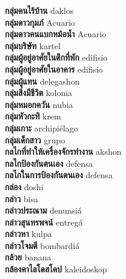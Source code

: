 \textbf{ กลุ่มคนไร้บ้าน  } daklos \\
\textbf{ กลุ่มดาวกุมภ์  } Acuario \\
\textbf{ กลุ่มดาวคนแบกหม้อน้ำ  } Acuario \\
\textbf{ กลุ่มบริษัท  } kartel \\
\textbf{ กลุ่มผู้อยู่อาศัยในตึกที่พัก  } edifisio \\
\textbf{ กลุ่มผู้อยู่อาศัยในอาคาร  } edifisio \\
\textbf{ กลุ่มผู้แทน  } delegashon \\
\textbf{ กลุ่มสิ่งมีชีวิต  } kolonia \\
\textbf{ กลุ่มหมอกควัน  } nubia \\
\textbf{ กลุ่มหัวกะทิ  } krem \\
\textbf{ กลุ่มเกาะ  } archipiélago \\
\textbf{ กลุ่มเด็กสาว  } grupo \\
\textbf{ กลไกที่ทำให้เครื่องจักรทำงาน  } akshon \\
\textbf{ กลไกป้องกันตนเอง  } defensa \\
\textbf{ กลไกในการป้องกันตนเอง  } defensa \\
\textbf{ กล่อง  } doshi \\
\textbf{ กล่าว  } bisa \\
\textbf{ กล่าวประณาม  } denunsiá \\
\textbf{ กล่าวสุนทรพจน์  } entregá \\
\textbf{ กล่าวหา  } kulpa \\
\textbf{ กล่าวโจมตี  } bombardiá \\
\textbf{ กล้วย  } banana \\
\textbf{ กล้องคาไลโดสโคป  } kaleidoskop \\
